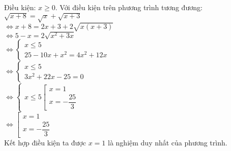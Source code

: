 \begin{Answer}{5}
Điều kiện: $ x \geq 0 $.
Với điều kiện trên phương trình tương đương: $ \sqrt{x+8 } = \sqrt{x } + \sqrt{x + 3}  $ \\
$ \Leftrightarrow x+8 = 2x +3 + 2 \sqrt{x(x+3 ) } $ \\
$ \Leftrightarrow 5-x = 2 \sqrt{x^2 + 3x } $ \\
$ \Leftrightarrow \begin{cases}
    x \leq 5 \\
    25 -10x + x^2 = 4x^2 + 12x
\end{cases} $ \\
$ \Leftrightarrow \begin{cases}
    x \leq 5 \\
    3x^2 +22x -25 =0
\end{cases} $ \\
$ \Leftrightarrow \begin{cases}
    x \leq 5
    \left[
        \begin{array}{l}
            x =1 \\
            x= -\dfrac{25 }{3 }
        \end{array}
    \right.
\end{cases} $ \\
$ \Leftrightarrow \left[
    \begin{array}{l}
        x =1 \\
        x=-\dfrac{25 }{3 }
    \end{array}
\right. $ \\
Kết hợp điều kiện ta được $x=1$ là nghiệm duy nhất của phương trình.
\end{Answer}
\begin{Answer}{6}

\end{Answer}
\begin{Answer}{7}

\end{Answer}
\begin{Answer}{8}

\end{Answer}
\begin{Answer}{9}

\end{Answer}
\begin{Answer}{10}

\end{Answer}
